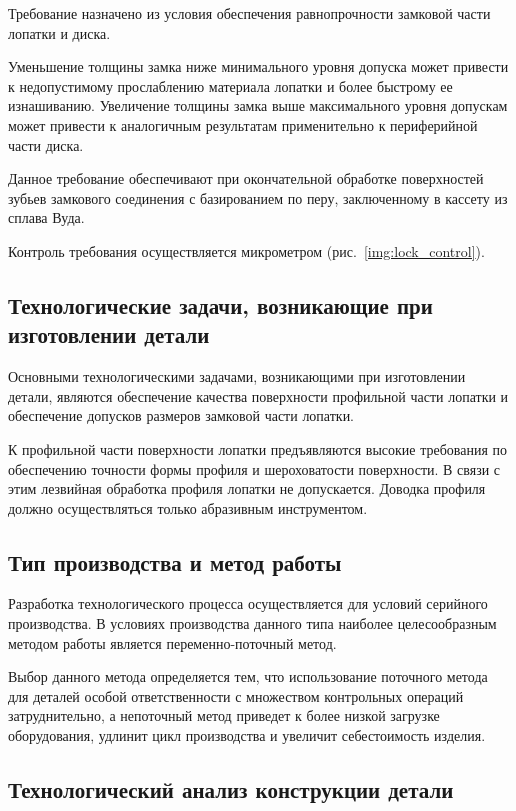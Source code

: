 Требование назначено из условия обеспечения равнопрочности замковой части лопатки и диска.

Уменьшение толщины замка ниже минимального уровня допуска может привести к недопустимому прослаблению материала лопатки и более быстрому ее изнашиванию. Увеличение толщины замка выше максимального уровня допускам может привести к аналогичным результатам применительно к периферийной части диска.

Данное требование обеспечивают при окончательной обработке поверхностей зубьев замкового соединения с базированием по перу, заключенному в кассету из сплава Вуда.

Контроль требования осуществляется микрометром (рис.~\ref{img:lock_control}).

\subsection{Технологические задачи, возникающие при изготовлении детали}

Основными технологическими задачами, возникающими при изготовлении детали, являются обеспечение качества поверхности профильной части лопатки и обеспечение допусков размеров замковой части лопатки.

К профильной части поверхности лопатки предъявляются высокие требования по обеспечению точности формы профиля и шероховатости поверхности. В связи с этим лезвийная обработка профиля лопатки не допускается. Доводка профиля должно осуществляться только абразивным инструментом.

\subsection{Тип производства и метод работы}

Разработка технологического процесса осуществляется для условий серийного производства. В условиях производства данного типа наиболее целесообразным методом работы является переменно-поточный метод.

Выбор данного метода определяется тем, что использование поточного метода для деталей особой ответственности с множеством контрольных операций затруднительно, а непоточный метод приведет к более низкой загрузке оборудования, удлинит цикл производства и увеличит себестоимость изделия.

\subsection{Технологический анализ конструкции детали}

